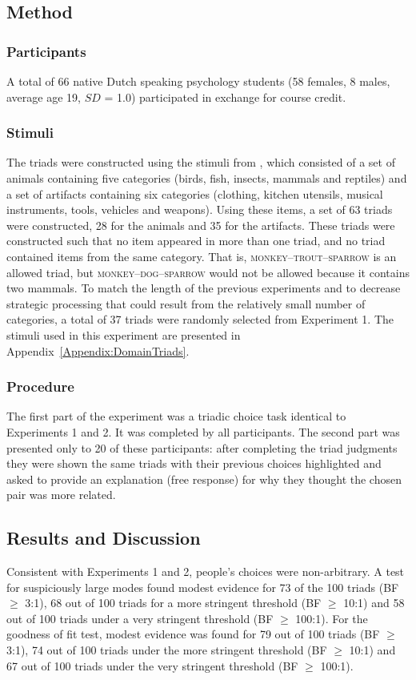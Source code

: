 \documentclass[doc]{apa6}
\newcommand{\stimulus}[1]{\textsc{#1}}
\begin{document}
\subsection{Method}
\subsubsection{Participants} A total of 66 native Dutch speaking psychology students (58 females, 8 males, average age 19, $SD$ = 1.0) participated in exchange for course credit.

\subsubsection{Stimuli} The triads were constructed using the stimuli from \textcite{DeDeyne2008}, which consisted of a set of animals containing five categories (birds, fish, insects, mammals and reptiles) and a set of artifacts containing six categories (clothing, kitchen utensils, musical instruments, tools, vehicles and weapons). Using these items, a set of 63 triads were constructed, 28 for the animals and 35 for the artifacts. These triads were constructed such that no item appeared in more than one triad, and no triad contained items from the same category. That is, \stimulus{monkey}--\stimulus{trout}--\stimulus{sparrow} is an allowed triad, but \stimulus{monkey}--\stimulus{dog}--\stimulus{sparrow} would not be allowed because it contains two mammals. To match the length of the previous experiments and to decrease strategic processing that could result from the relatively small number of categories, a total of 37 triads were randomly selected from Experiment 1.
The stimuli used in this experiment are presented in Appendix~\ref{Appendix:DomainTriads}.

\subsubsection{Procedure} The first part of the experiment was a triadic choice task identical to Experiments 1 and 2. It  was completed by all participants. The second part was presented only to 20 of these participants: after completing the triad judgments they were shown the same triads with their previous choices highlighted and asked to provide an explanation (free response) for why they thought the chosen pair was more related.

\subsection{Results and Discussion}
Consistent with Experiments 1 and 2, people's choices were non-arbitrary. A test for suspiciously large modes found modest evidence for 73 of the 100 triads (BF $\geq$ 3:1), 68 out of 100 triads for a more stringent threshold (BF $\geq$ 10:1) and 58 out of 100 triads under a very stringent threshold (BF $\geq$ 100:1). For the goodness of fit test, modest evidence was found for 79 out of 100 triads (BF $\geq$ 3:1), 74 out of 100 triads under the more stringent threshold (BF $\geq$ 10:1) and 67 out of 100 triads under the very stringent threshold (BF $\geq$ 100:1).
\end{document}
